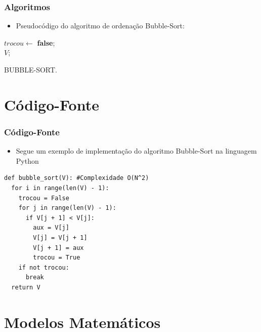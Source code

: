 \documentclass[mathsans,times]{beamer}
\begin{document}
\begin{frame}
	\frametitle{Algoritmos}
\begin{itemize}
	\item Pseudocódigo do algoritmo de ordenação Bubble-Sort:
\end{itemize}
\hspace{1mm}
\begin{algorithm}[H]
	\footnotesize
	 {
		$trocou \leftarrow$ \textbf{false};\\
	}
	\Return $V$;
	\footnotesize
	\caption{BUBBLE-SORT.}
	\label{alg:multistart}
\end{algorithm}
\end{frame}

\section{Código-Fonte}

\begin{frame}[fragile]
	\frametitle{Código-Fonte}
	\begin{itemize}
	\item Segue um exemplo de implementação do algoritmo Bubble-Sort na linguagem Python
\end{itemize}
\begin{lstlisting}
def bubble_sort(V): #Complexidade O(N^2)
  for i in range(len(V) - 1):
    trocou = False
    for j in range(len(V) - 1):
      if V[j + 1] < V[j]:
        aux = V[j] 
        V[j] = V[j + 1]
        V[j + 1] = aux
        trocou = True
    if not trocou:
      break
  return V
	\end{lstlisting}
\end{frame}

\section{Modelos Matemáticos}
\end{document}
